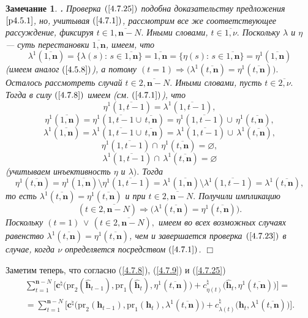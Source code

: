 \documentclass[11pt,twoside,openany]{report}
\newcommand{\ov}{\overline}
\newcounter{theo}
\newcounter{zam}
\newtheorem{zam}{Замечание}[section]
\newcommand{\TL}{\mbox{\bf{$\!\!$.}}}
\newcommand{\la}{\lambda}
\newcommand{\zc}{{\mathbf c}}
\newcommand{\nn}{{\mathbf n}}
\newcommand{\emp}{\varnothing}
\begin{document}
{{\begin{zam}\label{z4.7.1}{\TL} Проверка $(\ref{4.7.25})$ подобна доказательству
предложения~$\ref{p4.5.1}$, но, учитывая $(\ref{4.7.1})$, рассмотрим все же соответствующее
рассуждение, фиксируя $t\in\ov{1,\nn-N}.$ Иными словами, $t\in\ov{1,\nu}.$ Поскольку $\la$ и
$\eta$ --- суть перестановки $\ov{1,\nn}$, имеем, что
$$\la^1(\ov{1,\nn}) = \{\la(s):\,s\in\ov{1,\nn}\} = \ov{1,\nn} = \{\eta(s):\,s\in\ov{1,\nn}\} = \eta^1(\ov{1,\nn})
$$
(имеем аналог $(\ref{4.5.8})$), а потому $(t=1) \Rightarrow \bigl(\la^1(\ov{t,\nn}) =
\eta^1(\ov{t,\nn})\bigl).$ Осталось рассмотреть случай $t\in\ov{2,\nn-N}.$ Иными словами,
пусть $t\in\ov{2,\nu}.$ Тогда в силу $(\ref{4.7.8})$ имеем (см. $(\ref{4.7.1})$), что
$$\eta^1(\ov{1,t-1}) = \la^1(\ov{1,t-1}),$$
$$\eta^1(\ov{1,\nn}) = \eta^1(\ov{1,t-1} \cup\,\ov{t,\nn}) = \eta^1(\ov{1,t-1}) \cup\,\eta^1(\ov{t,\nn}),$$
$$\la^1(\ov{1,\nn}) = \la^1(\ov{1,t-1} \cup\,\ov{t,\nn}) = \la^1(\ov{1,t-1}) \cup\,\la^1(\ov{t,\nn}),$$
$$\eta^1(\ov{1,t-1}) \cap\,\eta^1(\ov{t,\nn}) = \emp,$$
$$\la^1(\ov{1,t-1}) \cap\,\la^1(\ov{t,\nn}) = \emp$$
(учитываем инъективность $\eta$ и $\la).$ Тогда
$$\eta^1(\ov{t,\nn})= \eta^1(\ov{1,\nn})\setminus \eta^1(\ov{1,t-1}) = \la^1(\ov{1,\nn})\setminus
\la^1(\ov{1,t-1})= \la^1(\ov{t,\nn}),
$$
то есть $\la^1(\ov{t,\nn}) = \eta^1(\ov{t,\nn})$ и при $t\in\ov{2,\nn-N}.$ Получили импликацию
$$(t\in\ov{2,\nn-N}) \Longrightarrow \bigl(\la^1(\ov{t,\nn}) = \eta^1(\ov{t,\nn})\bigl).
$$
Поскольку $(t=1)\,\vee\,(t\in\ov{2,\nn-N}),$ имеем во всех возможных случаях равенство
$\la^1(\ov{t,\nn}) = \eta^1(\ov{t,\nn})$, чем и завершается проверка $(\ref{4.7.23})$ в
случае, когда  $\nu$ определяется посредством $(\ref{4.7.1})$. \hfill $\Box$
\end{zam}

Заметим теперь, что согласно (\ref{4.7.8}), (\ref{4.7.9}) и (\ref{4.7.25})
\begin{eqnarray}
&\sum\limits_{t=1}^{\nn-N}\bigl[
\zc^\natural\bigl(\mathrm{pr}_2(\hat{\mathbf{h}}_{t-1}),\mathrm{pr}_1(\hat{\mathbf{h}}_t),
\eta^1(\ov{t,\nn})\bigl)+ c_{\eta(t)}^\natural\bigl(\hat{\mathbf{h}}_t,\eta^1(\ov{t,\nn})\bigl)\bigl] =
&\nonumber\\
&= \sum\limits_{t=1}^{\nn-N}\bigl[
\zc^\natural\bigl(\mathrm{pr}_2(\mathbf{h}_{t-1}),\mathrm{pr}_1(\mathbf{h}_t),
\la^1(\ov{t,\nn})\bigl)+ c_{\la(t)}^\natural\bigl(\mathbf{h}_t,\la^1(\ov{t,\nn})\bigl)\bigl].
&\label{4.7.26}
\end{eqnarray}

}}
\end{document}

